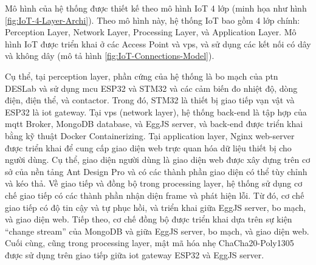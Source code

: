 Mô hình của hệ thống được thiết kế theo mô hình IoT 4 lớp (minh họa như hình \ref{fig:IoT-4-Layer-Archi}). Theo mô hình này, hệ thống IoT bao gồm 4 lớp chính: Perception Layer, Network Layer, Processing Layer, và Application Layer. Mô hình IoT được triển khai ở các Access Point và \acrshort{vps}, và sử dụng các kết nối có dây và không dây (mô tả hình \ref{fig:IoT-Connections-Model}).

Cụ thể, tại perception layer, phần cứng của hệ thống là bo mạch của \acrfull{ptn} DESLab và sử dụng \acrshort{mcu} ESP32 và STM32 và các cảm biến đo nhiệt độ, dòng điện, điện thể, và contactor. Trong đó, STM32 là thiết bị giao tiếp vạn vật và ESP32 là \acrshort{iot} gateway.
% 
Tại \acrshort{vps} (network layer), hệ thống back-end là tập hợp của \acrfull{mqtt} Broker, MongoDB database, và EggJS server, và back-end được triển khai bằng kỹ thuật Docker Containerizing. Tại application layer, Nginx web-server được triển khai để cung cấp giao diện web trực quan hóa dữ liệu thiết bị cho người dùng.
%
Cụ thể, giao diện người dùng là giao diện web được xây dựng trên cơ sở của nền tảng Ant Design Pro và có các thành phần giao diện có thể tùy chỉnh và kéo thả.
%
Về giao tiếp và đồng bộ trong processing layer, hệ thống sử dụng cơ chế giao tiếp có các thành phần nhận diện frame và phát hiện lỗi. Từ đó, cơ chế giao tiếp có độ tin cậy và tự phục hồi, và triển khai giữa EggJS server, bo mạch, và giao diện web.
%
Tiếp theo, cơ chế đồng bộ được triển khai dựa trên sự kiện ``change stream'' của MongoDB và giữa EggJS server, bo mạch, và giao diện web.
%
Cuối cùng, cũng trong processing layer, mật mã hóa nhẹ ChaCha20-Poly1305 được sử dụng trên giao tiếp giữa \acrshort{iot} gateway ESP32 và EggJS server.

